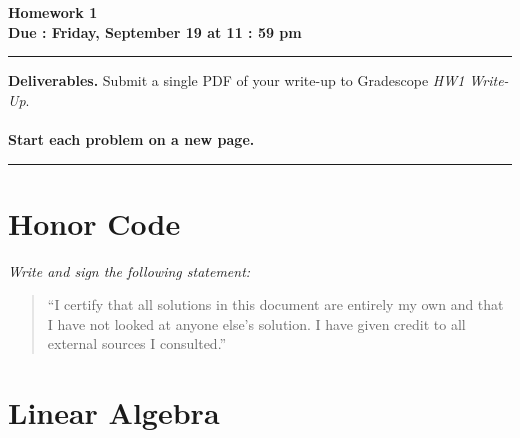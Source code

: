 \documentclass[11pt]{article}
\begin{document}
\begin{center}
    {\huge\bfseries Homework 1}\\[4pt]
    \textbf{Due : Friday, September 19 at 11 : 59 pm}\\
\end{center}

\vspace{0.5em}\hrule\vspace{1em}

\noindent\textbf{Deliverables.} Submit a single PDF of your write-up to Gradescope \emph{HW1 Write-Up}. 
\\
\\
\noindent\textbf{Start each problem on a new page.}


\vspace{0.5em}\hrule\vspace{0.75em}


\section*{Honor Code}

\noindent\emph{Write and sign the following statement:}

\begin{quote}\small
“I certify that all solutions in this document are entirely my own and that I have
not looked at anyone else’s solution. I have given credit to all external
sources I consulted.”
\end{quote}

\section*{Linear Algebra}
\end{document}
